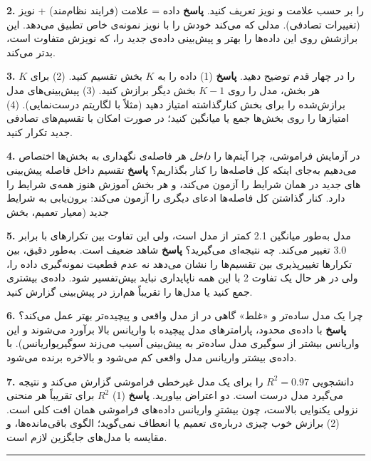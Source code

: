 \textbf{2.}  را بر حسب علامت و نویز تعریف کنید.
\textbf{پاسخ} داده = علامت (فرایند نظام‌مند) + نویز (تغییرات تصادفی).
مدلی که  می‌کند خودش را با نویز نمونه‌ی خاص تطبیق می‌دهد.
این برازشش روی این داده‌ها را بهتر و پیش‌بینی داده‌ی جدید را، که نویزش
متفاوت است، بدتر می‌کند.

\textbf{3.}  \(K\) را در چهار قدم توضیح
دهید. \textbf{پاسخ} (1) داده را به \(K\) بخش تقسیم کنید. (2) برای هر
بخش، مدل را روی \(K-1\) بخش دیگر برازش کنید. (3) پیش‌بینی‌های مدل برازش‌شده
را برای بخش کنارگذاشته امتیاز دهید (مثلاً با لگاریتم درست‌نمایی). (4)
امتیازها را روی بخش‌ها جمع یا میانگین کنید؛ در صورت امکان با تقسیم‌های
تصادفی جدید تکرار کنید.

\textbf{4.} در آزمایش فراموشی، چرا آیتم‌ها را \emph{داخل} هر فاصله‌ی
نگهداری به بخش‌ها اختصاص می‌دهیم به‌جای اینکه کل فاصله‌ها را کنار بگذاریم؟
\textbf{پاسخ} تقسیم داخل فاصله پیش‌بینی های جدید در همان شرایط
را آزمون می‌کند، و هر بخش آموزش هنوز همه‌ی شرایط را دارد. کنار گذاشتن کل
فاصله‌ها ادعای دیگری را آزمون می‌کند: برون‌یابی به شرایط جدید (معیار تعمیم،
بخش 

\textbf{5.}  مدل  به‌طور میانگین 2.1  کمتر از
مدل  است، ولی این تفاوت بین تکرارهای  با  برابر 3.0
تغییر می‌کند. چه نتیجه‌ای می‌گیرید؟ \textbf{پاسخ} شاهد ضعیف است. به‌طور
دقیق،  بین تکرارها تغییرپذیری بین تقسیم‌ها را نشان می‌دهد نه عدم
قطعیت نمونه‌گیری داده را، ولی در هر حال یک تفاوت 2  با این همه
ناپایداری نباید بیش‌تفسیر شود. داده‌ی بیشتری جمع کنید یا مدل‌ها را تقریباً
هم‌ارز در پیش‌بینی گزارش کنید.

\textbf{6.} چرا یک مدل ساده‌تر و «غلط» گاهی در  از مدل واقعی و
پیچیده‌تر بهتر عمل می‌کند؟ \textbf{پاسخ} با داده‌ی محدود، پارامترهای مدل
پیچیده با واریانس بالا برآورد می‌شوند و این واریانس بیشتر از سوگیری مدل
ساده‌تر به پیش‌بینی آسیب می‌زند  سوگیری\lr{--}واریانس). با داده‌ی
بیشتر واریانس مدل واقعی کم می‌شود و بالاخره برنده می‌شود.

\textbf{7.} دانشجویی \(R^2 = 0.97\) را برای یک مدل غیرخطی فراموشی گزارش
می‌کند و نتیجه می‌گیرد مدل درست است. دو اعتراض بیاورید. \textbf{پاسخ} (1)
\(R^2\) برای تقریباً هر منحنی نزولی یکنوایی بالاست، چون بیشترِ واریانس
داده‌های فراموشی همان افت کلی است. (2) برازش خوب چیزی درباره‌ی تعمیم یا
انعطاف نمی‌گوید؛ الگوی باقی‌مانده‌ها،  و مقایسه با مدل‌های جایگزین
لازم است.

\begin{center}\rule{0.5\linewidth}{0.5pt}\end{center}

